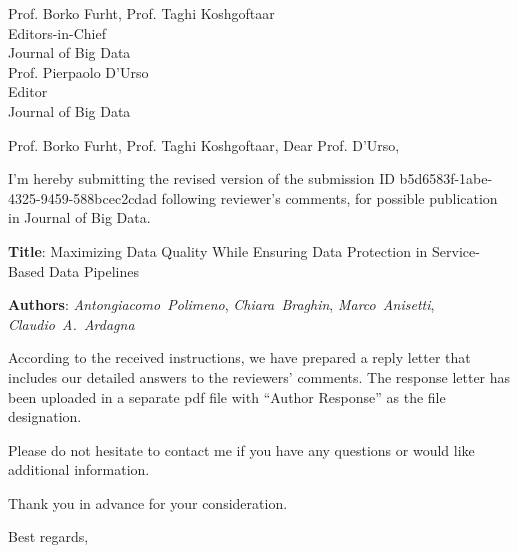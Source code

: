 \documentclass[12pt]{sriletter}
\begin{document}
\signature{\vspace*{-1.4cm}\\
    Claudio Ardagna}

\faxnumber{}

\begin{letter}{%
        Prof. Borko Furht, Prof. Taghi Koshgoftaar\\
        Editors-in-Chief\\
        Journal of Big Data\\
        \vspace{0.3cm}
        Prof. Pierpaolo D'Urso\\
        Editor\\
        Journal of Big Data\\
    }

    \opening{Prof. Borko Furht, Prof. Taghi Koshgoftaar, Dear Prof. D'Urso,}

    I'm hereby submitting the revised version of the submission ID b5d6583f-1abe-4325-9459-588bcec2cdad
    following reviewer's comments, for possible publication in Journal of Big Data.

    \textbf{Title}: Maximizing Data Quality While Ensuring Data Protection in Service-Based Data Pipelines\/

    \textbf{Authors}: \emph{Antongiacomo~Polimeno}, \emph{Chiara~Braghin}, \emph{Marco~Anisetti}, \emph{Claudio~A.~Ardagna}

    According to the received instructions, we have prepared a reply letter that includes our detailed answers to the reviewers' comments. The response letter has been uploaded in a separate pdf file with ``Author Response'' as the file designation.

    Please do not hesitate to contact me if you have any questions or would like additional information.

    Thank you in advance for your consideration.

    \closing{Best regards,}

\end{letter}
\end{document}
